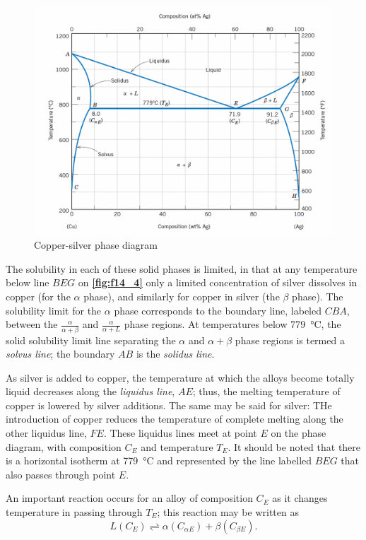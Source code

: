 \begin{figure} [ht]
  \centering
  \includegraphics[width=0.5\linewidth]{./figures/f14_4.png}
  \caption{Copper-silver phase diagram}
  \label{fig:f14_4}
\end{figure}

The solubility in each of these solid phases is limited, in that at any temperature below line $BEG$ on \textbf{\autoref{fig:f14_4}} only a limited concentration of silver dissolves in copper (for the $\alpha$ phase), and similarly for copper in silver (the $\beta$ phase). The solubility limit for the $\alpha$ phase corresponds to the boundary line, labeled $CBA$, between the $\frac{\alpha}{\alpha + \beta}$ and $\frac{\alpha}{\alpha + L}$ phase regions. At temperatures below \qty{779}{\celsius}, the solid solubility limit line separating the $\alpha$ and $\alpha + \beta$ phase regions is termed a \textit{solvus line}; the boundary $AB$ is the \textit{solidus line}.

As silver is added to copper, the temperature at which the alloys become totally liquid decreases along the \textit{liquidus line}, $AE$; thus, the melting temperature of copper is lowered by silver additions. The same may be said for silver: THe introduction of copper reduces the temperature of complete melting along the other liquidus line, $FE$. These liquidus lines meet at point $E$ on the phase diagram, with composition $C_E$ and temperature $T_E$. It should be noted that there is a horizontal isotherm at \qty{779}{\celsius} and represented by the line labelled $BEG$ that also passes through point $E$.

An important reaction occurs for an alloy of composition $C_E$ as it changes temperature in passing through $T_E$; this reaction may be written as
\[ 
L(C_E) {\rightleftharpoons} \alpha(C_{\alpha E}) + \beta(C_{\beta E})
.\]

